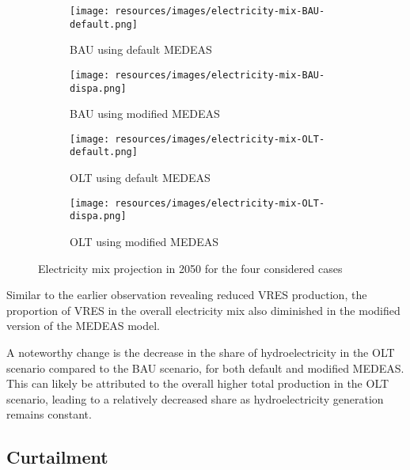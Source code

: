 \begin{figure}[h]
    \centering
    \begin{subfigure}{0.34\textwidth}
        \texttt{[image: resources/images/electricity-mix-BAU-default.png]}
        \caption{BAU using default MEDEAS}
        \label{fig:electricity-mix-BAU-def}
    \end{subfigure}
    \begin{subfigure}{0.34\textwidth}
        \texttt{[image: resources/images/electricity-mix-BAU-dispa.png]}
        \caption{BAU using modified MEDEAS}
        \label{fig:electricity-mix-BAU-dispa}
    \end{subfigure}
    \hfill
    \begin{subfigure}{0.34\textwidth}
        \texttt{[image: resources/images/electricity-mix-OLT-default.png]}
        \caption{OLT using default MEDEAS}
        \label{fig:electricity-mix-OLT-def}
    \end{subfigure}
    \begin{subfigure}{0.34\textwidth}
        \texttt{[image: resources/images/electricity-mix-OLT-dispa.png]}
        \caption{OLT using modified MEDEAS}
        \label{fig:electricity-mix-OLT-dispa}
    \end{subfigure}
    \caption{Electricity mix projection in 2050 for the four considered cases}
    \label{fig:electricity-mixes}
\end{figure}

Similar to the earlier observation revealing reduced VRES production, the proportion of VRES in the overall electricity mix also diminished in the modified version of the MEDEAS model.

A noteworthy change is the decrease in the share of hydroelectricity in the OLT scenario compared to the BAU scenario, for both default and modified MEDEAS. This can likely be attributed to the overall higher total production in the OLT scenario, leading to a relatively decreased share as hydroelectricity generation remains constant.

\subsection{Curtailment}

